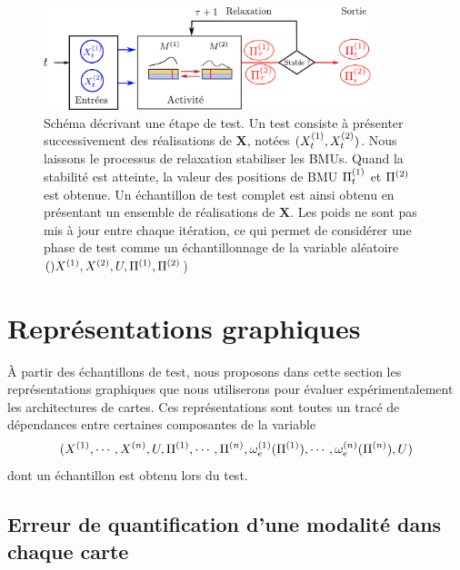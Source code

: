 \documentclass[../main]{subfiles}
\begin{document}
\begin{figure}
\centering
\includegraphics[width=0.85\textwidth]{tests_2maps.pdf}
\caption{Schéma décrivant une étape de test. Un test consiste à présenter successivement des réalisations de $\mathbf{X}$, notées $(X^{({1})}_t,X^{({2})}_t)$. Nous laissons le processus de relaxation stabiliser les BMUs. Quand la stabilité est atteinte, la valeur des positions de BMU $\Pi^{({1})}_t$ et $\Pi^{({2})}$ est obtenue. Un échantillon de test complet est ainsi obtenu en présentant un ensemble de réalisations de $\mathbf{X}$. Les poids ne sont pas mis à jour entre chaque itération, ce qui permet de considérer une phase de test comme un échantillonnage de la variable aléatoire $()X^{({1})},X^{({2})}, U, \Pi^{({1})}, \Pi^{({2})}$) }
\label{fig:flowchart}
\end{figure}

\section{Représentations graphiques}

\`A partir des échantillons de test, nous proposons dans cette section les représentations graphiques que nous utiliserons pour évaluer expérimentalement les architectures de cartes.
Ces représentations sont toutes un tracé de dépendances entre certaines composantes de la variable $$(X^{({1})}, \cdots, X^{({n})}, U, \Pi^{({1})}, \cdots, \Pi^{({n})}, \omega_e^{({1})}(\Pi^{({1})}), \cdots, \omega_e^{({n})}(\Pi^{({n})}),U)$$ dont un échantillon est obtenu lors du test.

\subsection{Erreur de quantification d'une modalité dans chaque carte}
\end{document}
